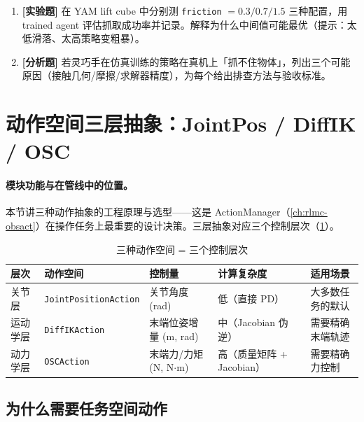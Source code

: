 \begin{practice}[本节练习]
\begin{enumerate}
  \item \textbf{[实验题]} 在 YAM lift cube 中分别测 \verb|friction| $=0.3/0.7/1.5$ 三种配置，用 trained agent 评估抓取成功率并记录。解释为什么中间值可能最优（提示：太低滑落、太高策略变粗暴）。
  \item \textbf{[分析题]} 若灵巧手在仿真训练的策略在真机上「抓不住物体」，列出三个可能原因（接触几何/摩擦/求解器精度），为每个给出排查方法与验收标准。
\end{enumerate}
\end{practice}

\section{动作空间三层抽象：JointPos / DiffIK / OSC}
\label{sec:rlmc-manip-action}

\paragraph{模块功能与在管线中的位置。}本节讲三种动作抽象的工程原理与选型——这是 ActionManager（\cref{ch:rlmc-obsact}）在操作任务上最重要的设计决策。三层抽象对应三个控制层次（\cref{tab:rlmc-manip-actionlevels}）。

\begin{table}[ht]
\centering
\small
\caption{三种动作空间 = 三个控制层次}
\label{tab:rlmc-manip-actionlevels}
\begin{tabular}{@{}lllll@{}}
\toprule
层次 & 动作空间 & 控制量 & 计算复杂度 & 适用场景 \\
\midrule
关节层 & \verb|JointPositionAction| & 关节角度 (rad) & 低（直接 PD） & 大多数任务的默认 \\
运动学层 & \verb|DiffIKAction| & 末端位姿增量 (m, rad) & 中（Jacobian 伪逆） & 需要精确末端轨迹 \\
动力学层 & \verb|OSCAction| & 末端力/力矩 (N, N$\cdot$m) & 高（质量矩阵 + Jacobian） & 需要精确力控制 \\
\bottomrule
\end{tabular}
\end{table}

\subsection{为什么需要任务空间动作}
\label{sec:rlmc-manip-whytask}

